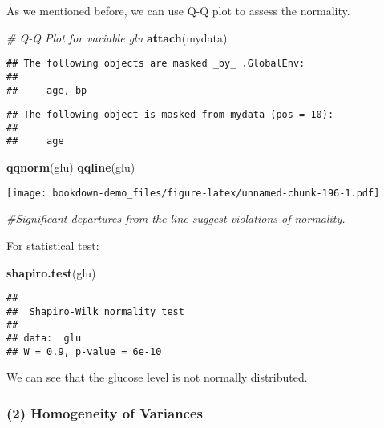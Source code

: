 \documentclass[]{book}
\newenvironment{Shaded}{\begin{snugshade}}{\end{snugshade}}
\newcommand{\KeywordTok}[1]{\textcolor[rgb]{0.13,0.29,0.53}{\textbf{#1}}}
\newcommand{\CommentTok}[1]{\textcolor[rgb]{0.56,0.35,0.01}{\textit{#1}}}
\newcommand{\NormalTok}[1]{#1}
\theoremstyle{definition}
\theoremstyle{definition}
\theoremstyle{definition}
\theoremstyle{remark}
\begin{document}
As we mentioned before, we can use Q-Q plot to assess the normality.

\begin{Shaded}
\begin{Highlighting}[]
\CommentTok{# Q-Q Plot for variable glu}
\KeywordTok{attach}\NormalTok{(mydata)}
\end{Highlighting}
\end{Shaded}

\begin{verbatim}
## The following objects are masked _by_ .GlobalEnv:
## 
##     age, bp
\end{verbatim}

\begin{verbatim}
## The following object is masked from mydata (pos = 10):
## 
##     age
\end{verbatim}

\begin{Shaded}
\begin{Highlighting}[]
\KeywordTok{qqnorm}\NormalTok{(glu)}
\KeywordTok{qqline}\NormalTok{(glu)}
\end{Highlighting}
\end{Shaded}

\texttt{[image: bookdown-demo\_files/figure-latex/unnamed-chunk-196-1.pdf]}

\begin{Shaded}
\begin{Highlighting}[]
\CommentTok{#Significant departures from the line suggest violations of normality.}
\end{Highlighting}
\end{Shaded}

For statistical test:

\begin{Shaded}
\begin{Highlighting}[]
\KeywordTok{shapiro.test}\NormalTok{(glu) }
\end{Highlighting}
\end{Shaded}

\begin{verbatim}
## 
##  Shapiro-Wilk normality test
## 
## data:  glu
## W = 0.9, p-value = 6e-10
\end{verbatim}

We can see that the glucose level is not normally distributed.

\subsubsection{(2) Homogeneity of
Variances}\label{homogeneity-of-variances}
\end{document}

